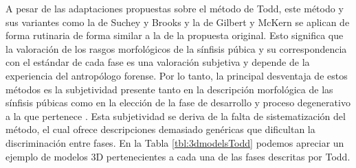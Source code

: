 A pesar de las adaptaciones propuestas sobre el método de Todd, este método y sus variantes como la de Suchey y Brooks y la de Gilbert y McKern se aplican de forma rutinaria de forma similar a la de la propuesta original. Esto significa que la valoración de los rasgos morfológicos de la sínfisis púbica y su correspondencia con el estándar de cada fase es una valoración subjetiva y depende de la experiencia del antropólogo forense. Por lo tanto, la principal desventaja de estos métodos es la subjetividad presente tanto en la descripción morfológica de las sínfisis púbicas como en la elección de la fase de desarrollo y proceso degenerativo a la que pertenece \cite{dudzik2015estimating}. Esta subjetividad se deriva de la falta de sistematización del método, el cual ofrece descripciones demasiado genéricas que dificultan la discriminación entre fases. En la Tabla \ref{tbl:3dmodelsTodd} podemos apreciar un ejemplo de modelos 3D pertenecientes a cada una de las fases descritas por Todd.\\

